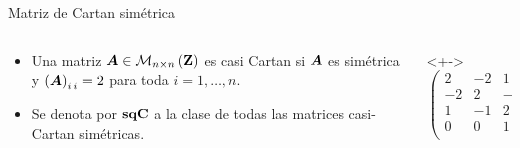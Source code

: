 \documentclass[spanish]{beamer}
\begin{document}
\begin{frame}{Matriz de Cartan simétrica}
  \begin{columns}
    \begin{column}{5cm}
        \begin{definition}
          \begin{itemize}
            \item<+->  Una matriz $\boldsymbol{A} \in \mathcal{M}_{n \times n}\left(\mathbf{Z}\right)$ es 
            \alert{casi Cartan } si $\boldsymbol{A}$ es simétrica y $\left({\boldsymbol{A}}\right)_{{i}\,{i}} = 2$ para toda $i = 1, \ldots, n$.
            \item<+-> Se denota por $\mathbf{sqC}$ a la clase de todas las 
            matrices 
            casi-Cartan simétricas.
          \end{itemize}      
        \end{definition}
    \end{column}
    \begin{column}{5cm}
      \begin{example}<+->
        \begin{equation*}
        \begin{pmatrix}
        2 & -2 & 1 & 0\\
        -2 & 2 & -1 & 0\\
        1 & -1 & 2 & 1\\
        0 & 0 & 1 & 2\\
        \end{pmatrix}
        \end{equation*}
      \end{example}
    \end{column}
  \end{columns}
\end{frame}
\end{document}
